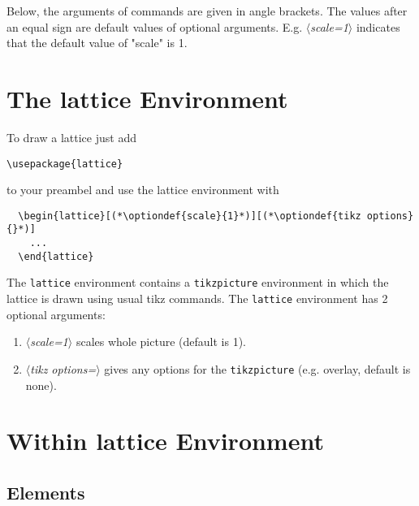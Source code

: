 \documentclass[a4paper]{scrartcl}
\newcommand{\optiondef}[2]{{\color{green!50!black}$\langle$\textit{#1=#2}$\rangle$}}
\begin{document}
Below, the arguments of commands are given in angle brackets. The values after an equal
sign are default values of optional arguments. E.g. \optiondef{scale}{1} indicates that
the default value of "scale" is 1.



\section{The lattice Environment}
\label{sec-4}

To draw a lattice just add
\begin{lstlisting}
\usepackage{lattice}
\end{lstlisting}
to your preambel and use the lattice environment with
\begin{lstlisting}
  \begin{lattice}[(*\optiondef{scale}{1}*)][(*\optiondef{tikz options}{}*)]
    ...
  \end{lattice}
\end{lstlisting}
The \lstinline+lattice+ environment contains a \lstinline+tikzpicture+ environment in
which the lattice is drawn using usual tikz commands. The \lstinline+lattice+ environment
has 2 optional arguments:
\begin{enumerate}
\item \optiondef{scale}{1} scales whole picture (default is 1).
\item \optiondef{tikz options}{} gives any options for the \lstinline+tikzpicture+ (e.g.
  overlay, default is none).
\end{enumerate}


\section{Within lattice Environment}
\label{sec-5}

\subsection{Elements}
\label{sec-5-1}
\end{document}

